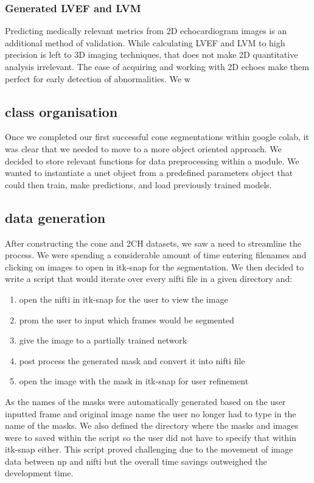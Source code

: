 \documentclass[12pt]{article}
\begin{document}
\subsubsection{Generated LVEF and LVM}
Predicting medically relevant metrics from 2D echocardiogram images is an additional method of validation.
While calculating LVEF and LVM to high precision is left to 3D imaging techniques, that does not make 2D quantitative analysis irrelevant.
The ease of acquiring and working with 2D echoes make them perfect for early detection of abnormalities.
We w

\subsection{class organisation}
Once we completed our first successful cone segmentations within google colab, it was clear that we needed to move to a more object oriented approach.
We decided to  store relevant functions for data preprocessing within a module. 
We wanted to instantiate a unet object from a predefined parameters object that could then train, make predictions, and load previously trained models.

\subsection{data generation}
After constructing the cone and 2CH datasets, we saw a need to streamline the process. 
We were spending a considerable amount of time entering filenames and clicking on images to open in itk-snap for the segmentation.
We then decided to write a script that would iterate over every nifti file in a given directory and:
\begin{enumerate}
	\item{open the nifti in itk-snap for the user to view the image}
	\item{prom the user to input which frames would be segmented}
	\item{give the image to a partially trained network}
	\item{post process the generated mask and convert it into nifti file}
	\item{open the image with the mask in itk-snap for user refinement}
\end{enumerate}
As the names of the masks were automatically generated based on the user inputted frame and original image name the user no longer had to type in the name of the masks.
We also defined the directory where the masks and images were to saved within the script so the user did not have to specify that within itk-snap either.
This script proved challenging due to the movement of image data between np and nifti but the overall time savings outweighed the development time.
\end{document}
